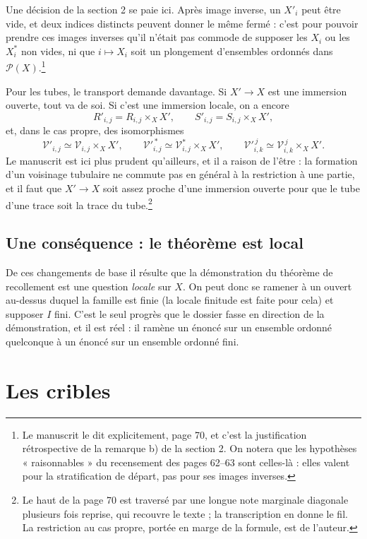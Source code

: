 \documentclass[11pt,a4paper]{article}
\begin{document}
Une décision de la section 2 se paie ici. Après image inverse, un
$X'_{i}$ peut être vide, et deux indices distincts peuvent donner le même fermé :
c'est pour pouvoir prendre ces images inverses qu'il n'était pas
commode de supposer les $X_{i}$ ou les $X_{i}^{*}$ non vides, ni que
$i \mapsto X_{i}$ soit un plongement d'ensembles ordonnés dans
$\mathcal{P}(X)$.\footnote{Le manuscrit le dit explicitement, page 70, et c'est
la justification rétrospective de la remarque b) de la section 2. On notera que
les hypothèses « raisonnables » du recensement des pages 62--63 sont
celles-là : elles valent pour la stratification de départ, pas pour ses images
inverses.}

Pour les tubes, le transport demande davantage. Si $X' \to X$ est une immersion
ouverte, tout va de soi. Si c'est une immersion locale, on a encore
\[
  R'_{i,j} = R_{i,j} \times_{X} X', \qquad S'_{i,j} = S_{i,j} \times_{X} X',
\]
et, dans le cas propre, des isomorphismes
\[
  \mathcal{V}'_{i,j} \simeq \mathcal{V}_{i,j} \times_{X} X',
  \qquad
  \mathcal{V}'^{\,*}_{i,j} \simeq \mathcal{V}^{*}_{i,j} \times_{X} X',
  \qquad
  \mathcal{V}'^{\,j}_{i,k} \simeq \mathcal{V}^{\,j}_{i,k} \times_{X} X'.
\]
Le manuscrit est ici plus prudent qu'ailleurs, et il a raison de l'être : la
formation d'un voisinage tubulaire ne commute pas en général à la restriction à
une partie, et il faut que $X' \to X$ soit assez proche d'une immersion ouverte
pour que le tube d'une trace soit la trace du tube.\footnote{Le haut de la page
70 est traversé par une longue note marginale diagonale plusieurs fois reprise,
qui recouvre le texte ; la transcription en donne le fil. La restriction au cas
propre, portée en marge de la formule, est de l'auteur.}

\subsection*{Une conséquence : le théorème est local}

De ces changements de base il résulte que la démonstration du théorème de
recollement est une question \emph{locale} sur $X$. On peut donc se ramener à un
ouvert au-dessus duquel la famille est finie (la locale finitude est faite pour
cela) et supposer $I$ fini. C'est le seul progrès que le dossier fasse en
direction de la démonstration, et il est réel : il ramène un énoncé sur un
ensemble ordonné quelconque à un énoncé sur un ensemble ordonné fini.

\section*{Les cribles}
\end{document}
